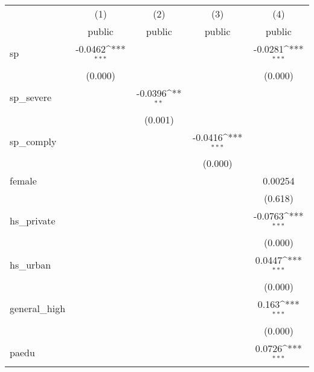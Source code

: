 {
\def\sym#1{\ifmmode^{#1}\else\(^{#1}\)\fi}
\begin{tabular}{l*{4}{c}}
\hline\hline
            &\multicolumn{1}{c}{(1)}&\multicolumn{1}{c}{(2)}&\multicolumn{1}{c}{(3)}&\multicolumn{1}{c}{(4)}\\
            &\multicolumn{1}{c}{public}&\multicolumn{1}{c}{public}&\multicolumn{1}{c}{public}&\multicolumn{1}{c}{public}\\
\hline
sp          &     -0.0462\sym{***}&                     &                     &     -0.0281\sym{***}\\
            &     (0.000)         &                     &                     &     (0.000)         \\
[1em]
sp\_severe   &                     &     -0.0396\sym{**} &                     &                     \\
            &                     &     (0.001)         &                     &                     \\
[1em]
sp\_comply   &                     &                     &     -0.0416\sym{***}&                     \\
            &                     &                     &     (0.000)         &                     \\
[1em]
female      &                     &                     &                     &     0.00254         \\
            &                     &                     &                     &     (0.618)         \\
[1em]
hs\_private  &                     &                     &                     &     -0.0763\sym{***}\\
            &                     &                     &                     &     (0.000)         \\
[1em]
hs\_urban    &                     &                     &                     &      0.0447\sym{***}\\
            &                     &                     &                     &     (0.000)         \\
[1em]
general\_high&                     &                     &                     &       0.163\sym{***}\\
            &                     &                     &                     &     (0.000)         \\
[1em]
paedu       &                     &                     &                     &      0.0726\sym{***}\\

\end{tabular}}
